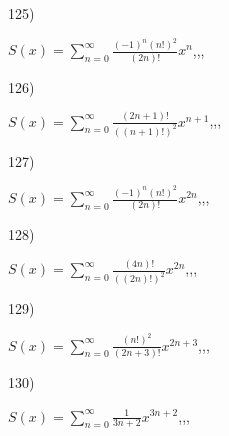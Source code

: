 \documentclass[11pt, ukrainian]{article}
\begin{document}
\par
\vspace{0.9cm}
125) \space 
{%
{$S(x)=\sum\limits_{n=0}^{\infty}{\frac{{(-1)^n}{(n!)^2}}{(2n)!}}{x^{{n}}}$},,, \par \smallskip  
}
\par
\vspace{0.9cm}
126) \space 
{%
{$S(x)=\sum\limits_{n=0}^{\infty}{\frac{(2n+1)!}{((n+1)!)^2}}{x^{{n+1}}}$},,, \par \smallskip  
}
\par
\vspace{0.9cm}
127) \space 
{%
{$S(x)=\sum\limits_{n=0}^{\infty}{\frac{{(-1)^n}{(n!)^2}}{(2n)!}}{x^{{2n}}}$},,, \par \smallskip  
}
\par
\vspace{0.9cm}
128) \space 
{%
{$S(x)=\sum\limits_{n=0}^{\infty}{\frac{(4n)!}{{((2n)!)^2}}}{x^{{2n}}}$},,, \par \smallskip  
}
\par
\newpage
129) \space 
{%
{$S(x)=\sum\limits_{n=0}^{\infty}{\frac{(n!)^2}{(2n+3)!}}{x^{{2n+3}}}$},,, \par \smallskip  
}
\par
\vspace{0.9cm}
130) \space 
{%
{$S(x)=\sum\limits_{n=0}^{\infty}{\frac{1}{3n+2}}{x^{{3n+2}}}$},,, \par \smallskip  
}
\end{document}
